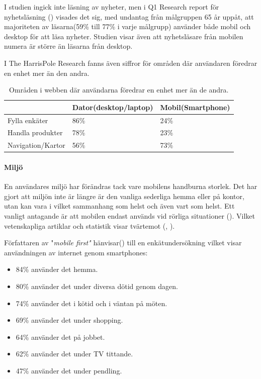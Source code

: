 \documentclass[11pt]{article}
\begin{document}
I studien ingick inte läsning av nyheter, men i Q1 Research report för nyhetsläsning (\cite{q1research}) visades det sig, med undantag från målgruppen 65 år uppåt, att majoriteten av läsarna(59\% till 77\% i varje målgrupp) använder både mobil och desktop för att läsa nyheter. Studien visar även att nyhetsläsare från mobilen numera är större än läsarna från desktop.

I The HarrisPole Research fanns även siffror för områden där användaren föredrar en enhet mer än den andra.

\begin{table}[H]
	\centering
	\begin{tabular}{|p{4cm}|p{4cm}|p{4cm}|}
	\hline
	~&Dator(desktop/laptop)&Mobil(Smartphone)\\ \hline
	Fylla enkäter &86\%&24\%\\ \hline
	Handla produkter&78\%&23\%\\ \hline
	Navigation/Kartor&56\%&73\%\\ \hline
	\end{tabular}
    \caption {Områden i webben där användarna föredrar en enhet mer än de andra.}
\end{table}

\paragraph{Miljö} \mbox{}

En användares miljö har förändras tack vare mobilens handburna storlek. Det har gjort att miljön inte är längre är den vanliga sederliga hemma eller på kontor, utan kan vara i vilket sammanhang som helst och även vart som helst. Ett vanligt antagande är att mobilen endast används vid rörliga situationer (\cite[s.12]{mobilefirstluke}). Vilket vetenskapliga artiklar och statistik visar tvärtemot (\cite{mobilewebsearch}, \cite{mobilefirstluke}).

Författaren av "\textit{mobile first"} hänvisar(\cite[s.12]{mobilefirstluke}) till en enkätundersökning vilket visar användningen av internet genom smartphones:
\begin{itemize}
	\item{84\% använder det hemma.}
	\item{80\% använder det under diversa dötid genom dagen.}
	\item{74\% använder det i kötid och i väntan på möten.}
	\item{69\% använder det under shopping.}
	\item{64\% använder det på jobbet.}
	\item{62\% använder det under TV tittande.}
	\item{47\% använder det under pendling.}
\end{itemize}
\bigskip
\end{document}
